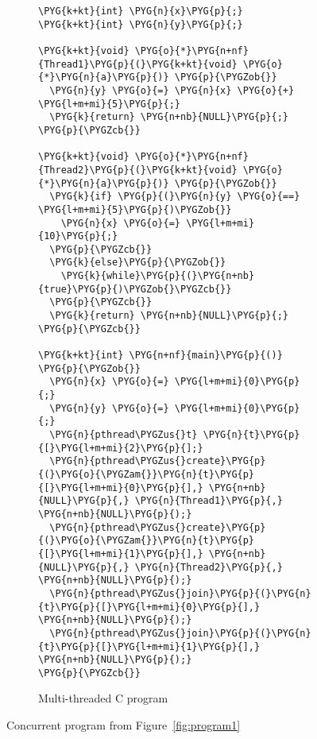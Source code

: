 \begin{figure}[t]
\begin{subfigure}{.4\textwidth}
\begin{Verbatim}[commandchars=\\\{\}, fontsize=\footnotesize, baselinestretch=0.5]
\PYG{k+kt}{int} \PYG{n}{x}\PYG{p}{;}
\PYG{k+kt}{int} \PYG{n}{y}\PYG{p}{;}

\PYG{k+kt}{void} \PYG{o}{*}\PYG{n+nf}{Thread1}\PYG{p}{(}\PYG{k+kt}{void} \PYG{o}{*}\PYG{n}{a}\PYG{p}{)} \PYG{p}{\PYGZob{}}
  \PYG{n}{y} \PYG{o}{=} \PYG{n}{x} \PYG{o}{+} \PYG{l+m+mi}{5}\PYG{p}{;}
  \PYG{k}{return} \PYG{n+nb}{NULL}\PYG{p}{;}
\PYG{p}{\PYGZcb{}}

\PYG{k+kt}{void} \PYG{o}{*}\PYG{n+nf}{Thread2}\PYG{p}{(}\PYG{k+kt}{void} \PYG{o}{*}\PYG{n}{a}\PYG{p}{)} \PYG{p}{\PYGZob{}}
  \PYG{k}{if} \PYG{p}{(}\PYG{n}{y} \PYG{o}{==} \PYG{l+m+mi}{5}\PYG{p}{)\PYGZob{}}
    \PYG{n}{x} \PYG{o}{=} \PYG{l+m+mi}{10}\PYG{p}{;}
  \PYG{p}{\PYGZcb{}}
  \PYG{k}{else}\PYG{p}{\PYGZob{}}
    \PYG{k}{while}\PYG{p}{(}\PYG{n+nb}{true}\PYG{p}{)\PYGZob{}\PYGZcb{}}
  \PYG{p}{\PYGZcb{}}
  \PYG{k}{return} \PYG{n+nb}{NULL}\PYG{p}{;}
\PYG{p}{\PYGZcb{}}

\PYG{k+kt}{int} \PYG{n+nf}{main}\PYG{p}{()} \PYG{p}{\PYGZob{}}
  \PYG{n}{x} \PYG{o}{=} \PYG{l+m+mi}{0}\PYG{p}{;}
  \PYG{n}{y} \PYG{o}{=} \PYG{l+m+mi}{0}\PYG{p}{;}
  \PYG{n}{pthread\PYGZus{}t} \PYG{n}{t}\PYG{p}{[}\PYG{l+m+mi}{2}\PYG{p}{];}
  \PYG{n}{pthread\PYGZus{}create}\PYG{p}{(}\PYG{o}{\PYGZam{}}\PYG{n}{t}\PYG{p}{[}\PYG{l+m+mi}{0}\PYG{p}{],} \PYG{n+nb}{NULL}\PYG{p}{,} \PYG{n}{Thread1}\PYG{p}{,} \PYG{n+nb}{NULL}\PYG{p}{);}
  \PYG{n}{pthread\PYGZus{}create}\PYG{p}{(}\PYG{o}{\PYGZam{}}\PYG{n}{t}\PYG{p}{[}\PYG{l+m+mi}{1}\PYG{p}{],} \PYG{n+nb}{NULL}\PYG{p}{,} \PYG{n}{Thread2}\PYG{p}{,} \PYG{n+nb}{NULL}\PYG{p}{);}
  \PYG{n}{pthread\PYGZus{}join}\PYG{p}{(}\PYG{n}{t}\PYG{p}{[}\PYG{l+m+mi}{0}\PYG{p}{],} \PYG{n+nb}{NULL}\PYG{p}{);}
  \PYG{n}{pthread\PYGZus{}join}\PYG{p}{(}\PYG{n}{t}\PYG{p}{[}\PYG{l+m+mi}{1}\PYG{p}{],} \PYG{n+nb}{NULL}\PYG{p}{);}
\PYG{p}{\PYGZcb{}}
\end{Verbatim}
\vspace{0.5cm}
\caption{Multi-threaded C program}
\label{simple_c}
\end{subfigure}
\caption{Concurrent program from Figure~\ref{fig:program1}}
\label{fig:programs}
\end{figure}